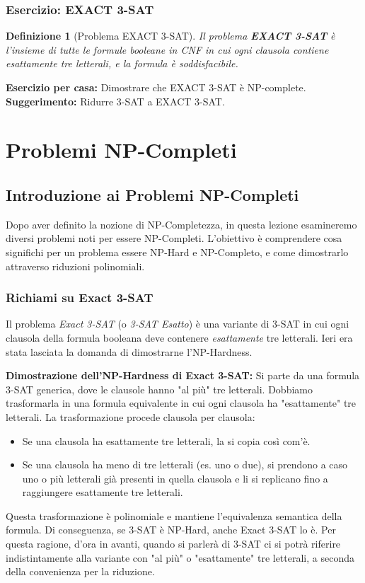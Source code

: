 \documentclass[a4paper, 11pt]{book} %
\newtheorem{definition}[theorem]{Definizione}
\theoremstyle{definition}
\begin{document}
\subsection{Esercizio: EXACT 3-SAT}
\begin{definition}[Problema EXACT 3-SAT]
Il problema \textbf{EXACT 3-SAT} è l'insieme di tutte le formule booleane in CNF in cui ogni clausola contiene \emph{esattamente} tre letterali, e la formula è soddisfacibile.
\end{definition}

\textbf{Esercizio per casa:} Dimostrare che EXACT 3-SAT è NP-complete.
\textbf{Suggerimento:} Ridurre 3-SAT a EXACT 3-SAT.



\chapter{Problemi NP-Completi}



\section{Introduzione ai Problemi NP-Completi}

Dopo aver definito la nozione di NP-Completezza, in questa lezione esamineremo diversi problemi noti per essere NP-Completi. L'obiettivo è comprendere cosa significhi per un problema essere NP-Hard e NP-Completo, e come dimostrarlo attraverso riduzioni polinomiali.

\subsection{Richiami su Exact 3-SAT}

Il problema \emph{Exact 3-SAT} (o \emph{3-SAT Esatto}) è una variante di 3-SAT in cui ogni clausola della formula booleana deve contenere \emph{esattamente} tre letterali. Ieri era stata lasciata la domanda di dimostrarne l'NP-Hardness.

\textbf{Dimostrazione dell'NP-Hardness di Exact 3-SAT:}
Si parte da una formula 3-SAT generica, dove le clausole hanno "al più" tre letterali. Dobbiamo trasformarla in una formula equivalente in cui ogni clausola ha "esattamente" tre letterali.
La trasformazione procede clausola per clausola:
\begin{itemize}
    \item Se una clausola ha esattamente tre letterali, la si copia così com'è.
    \item Se una clausola ha meno di tre letterali (es. uno o due), si prendono a caso uno o più letterali già presenti in quella clausola e li si replicano fino a raggiungere esattamente tre letterali.
\end{itemize}
Questa trasformazione è polinomiale e mantiene l'equivalenza semantica della formula. Di conseguenza, se 3-SAT è NP-Hard, anche Exact 3-SAT lo è. Per questa ragione, d'ora in avanti, quando si parlerà di 3-SAT ci si potrà riferire indistintamente alla variante con "al più" o "esattamente" tre letterali, a seconda della convenienza per la riduzione.
\end{document}
